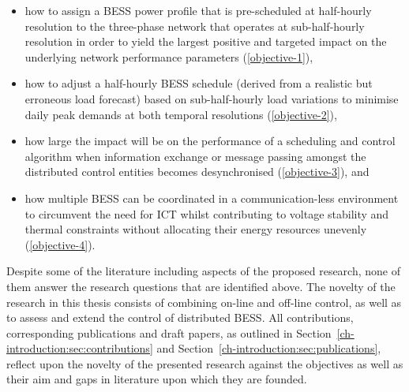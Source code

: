 \begin{itemize}
	\item how to assign a BESS power profile that is pre-scheduled at half-hourly resolution to the three-phase network that operates at sub-half-hourly resolution in order to yield the largest positive and targeted impact on the underlying network performance parameters (\ref{objective-1}),
	\item how to adjust a half-hourly BESS schedule (derived from a realistic but erroneous load forecast) based on sub-half-hourly load variations to minimise daily peak demands at both temporal resolutions (\ref{objective-2}),
	\item how large the impact will be on the performance of a scheduling and control algorithm when information exchange or message passing amongst the distributed control entities becomes desynchronised (\ref{objective-3}), and
	\item how multiple BESS can be coordinated in a communication-less environment to circumvent the need for ICT whilst contributing to voltage stability and thermal constraints without allocating their energy resources unevenly (\ref{objective-4}).
\end{itemize}

Despite some of the literature including aspects of the proposed research, none of them answer the research questions that are identified above.
The novelty of the research in this thesis consists of combining on-line and off-line control, as well as to assess and extend the control of distributed BESS.
All contributions, corresponding publications and draft papers, as outlined in Section~\ref{ch-introduction:sec:contributions} and Section~\ref{ch-introduction:sec:publications}, reflect upon the novelty of the presented research against the objectives as well as their aim and gaps in literature upon which they are founded.
